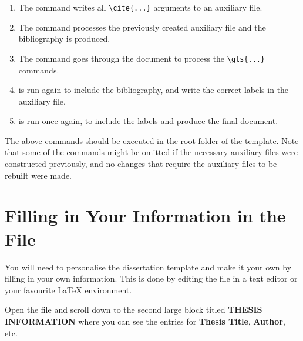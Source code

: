 \begin{enumerate}
  \item {}
  
	The command  writes all \texttt{\textbackslash cite\{...\}} arguments to an auxiliary file.

  \item {}
  
	The command  processes the previously created auxiliary file and the bibliography is produced.

  \item {}
	
	The command  goes through the document to process the \texttt{\textbackslash gls\{...\}} commands.

  \item {}

	 is run again to include the bibliography, and write the correct labels in the auxiliary file.

  \item {}	
	
	 is run once again, to include the labels and produce the final document.
\end{enumerate}

The above commands should be executed in the root folder of the template. Note that some of the commands might be omitted if the necessary auxiliary files were constructed previously, and no changes that require the auxiliary files to be rebuilt were made.


\section{Filling in Your Information in the  File}
\label{FillingFile}

You will need to personalise the dissertation template and make it your own by filling in your own information. This is done by editing the  file in a text editor or your favourite LaTeX environment.

Open the file and scroll down to the second large block titled \textbf{THESIS INFORMATION} where you can see the entries for \textbf{Thesis Title}, \textbf{Author}, etc.

